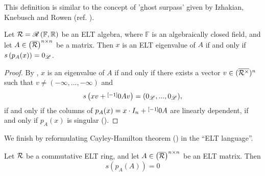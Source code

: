 This definition is similar to the concept of 'ghost surpass' given by Izhakian, Knebusch and Rowen (ref. \cite{IKR}).\\

\begin{prop}
Let $\R=\ELT{\RR}{\mathbb{F}}$ be an ELT algebra, where $\mathbb{F}$ is an algebraically closed field, and let $A\in \left(\overline{\R}\right)^{n\times n}$ be a matrix. Then $x$ is an ELT eigenvalue of $A$ if and only if $s\left(p_A(x)\right)=0_{\L}$.
\end{prop}

\begin{proof}
By , $x$ is an eigenvalue of $A$ if and only if there exists a vector $v\in (\overline{\R^{\times}})^n$ such that $v\neq (-\infty,...,-\infty)$ and $$s\left(xv+\layer{0}{-1}Av\right)=(0_{\L},...,0_{\L}),$$
if and only if the columns of $p_A(x)=x\cdot I_n+\layer{0}{-1}A$ are linearly dependent, if and only if $p_A(x)$ is singular (\cite[Theorem 1.7]{BS}).
\end{proof}

We finish by reformulating Cayley-Hamilton theorem () in the ``ELT language''.

\begin{cor}\label{cor:elt-cayley-hamilton}
Let $\R$ be a commutative ELT ring, and let $A\in \left(\overline{\R}\right)^{n\times n}$ be an ELT matrix. Then
$$s\left(p_A\left(A\right)\right)=0$$
\end{cor}